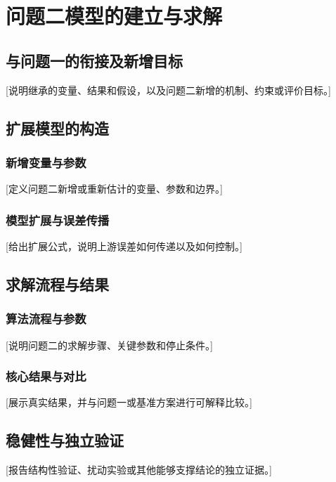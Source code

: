 \section{问题二模型的建立与求解}

\subsection{与问题一的衔接及新增目标}
[说明继承的变量、结果和假设，以及问题二新增的机制、约束或评价目标。]

\subsection{扩展模型的构造}
\subsubsection{新增变量与参数}
[定义问题二新增或重新估计的变量、参数和边界。]

\subsubsection{模型扩展与误差传播}
[给出扩展公式，说明上游误差如何传递以及如何控制。]

\subsection{求解流程与结果}
\subsubsection{算法流程与参数}
[说明问题二的求解步骤、关键参数和停止条件。]

\subsubsection{核心结果与对比}
[展示真实结果，并与问题一或基准方案进行可解释比较。]

\subsection{稳健性与独立验证}
[报告结构性验证、扰动实验或其他能够支撑结论的独立证据。]
